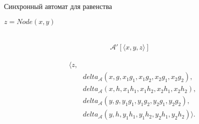 \documentclass{beamer}
\newcommand{\aut}{\mathcal{A}}
\begin{document}
\begin{frame}{Синхронный автомат для равенства}
\begin{minipage}{1\linewidth}
$z = Node(x, y)$\\
\\
\PattternAutomata
\end{minipage}
\begin{minipage}{0.4\linewidth}
\vspace{1em}
\onslide\begin{align*}
    \aut'[\langle x, y, z \rangle]
\end{align*}
\end{minipage}
\begin{minipage}{0.4\linewidth}
\vspace{1em}
\begin{align*}
    &\langle z, \\
    &\qquad delta_{\aut}(x, g, x_1g_1, x_1g_2, x_2g_1, x_2g_2), \\
    &\qquad delta_{\aut}(x, h, x_1h_1, x_1h_2, x_2h_1, x_2h_2), \\
    &\qquad delta_{\aut}(y, g, y_1g_1, y_1g_2, y_2g_1, y_2g_2), \\
    &\qquad delta_{\aut}(y, h, y_1h_1, y_1h_2, y_2h_1, y_2h_2) \rangle.
\end{align*}
\end{minipage}
\end{frame}
\end{document}
